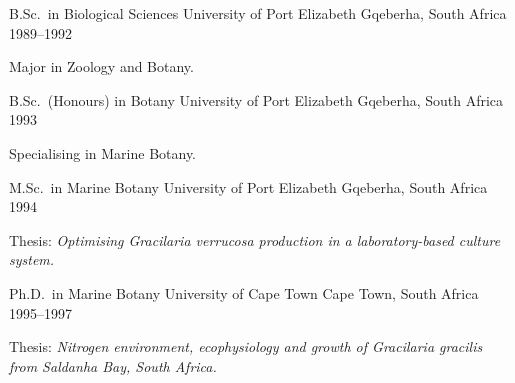 


\begin{cventries}


\cventry
{B.Sc.~in Biological Sciences} %
{University of Port Elizabeth} %
{Gqeberha, South Africa} %
{1989--1992} %
{
\begin{cvitems}
\item {Major in Zoology and Botany.}
\end{cvitems}
}

\cventry
{B.Sc.~(Honours) in Botany} %
{University of Port Elizabeth} %
{Gqeberha, South Africa} %
{1993} %
{
\begin{cvitems}
\item {Specialising in Marine Botany.}
\end{cvitems}
}

\cventry
{M.Sc.~in Marine Botany} %
{University of Port Elizabeth} %
{Gqeberha, South Africa} %
{1994} %
{ %
\begin{cvitems}
\item {Thesis: \emph{Optimising \emph{Gracilaria} verrucosa production in a laboratory-based culture system.}}
\end{cvitems}
}

\cventry
{Ph.D.~in Marine Botany} %
{University of Cape Town} %
{Cape Town, South Africa} %
{1995--1997} %
{ %
\begin{cvitems}
\item {Thesis: \emph{Nitrogen environment, ecophysiology and growth of \emph{Gracilaria gracilis} from Saldanha Bay, South Africa.}}
\end{cvitems}
}


\end{cventries}